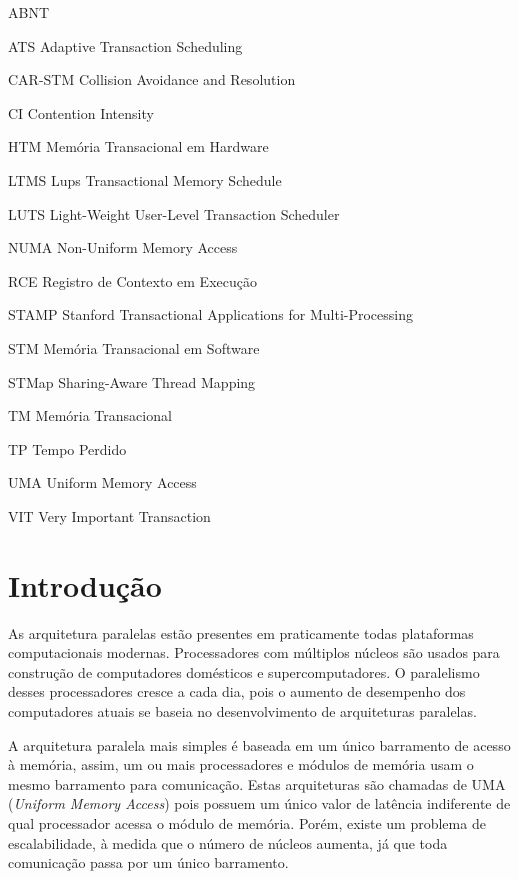 \documentclass[diss,capa]{texufpel}
\begin{document}
\begin{listofabbrv}{ABNT}%
  \item[ATS] \qquad Adaptive Transaction Scheduling
  \item[CAR-STM] \qquad Collision Avoidance and Resolution
  \item[CI] \qquad Contention Intensity
  \item[HTM] \qquad Memória Transacional em Hardware 
  \item[LTMS] \qquad Lups Transactional Memory Schedule
  \item[LUTS] \qquad Light-Weight User-Level Transaction Scheduler
  \item[NUMA] \qquad Non-Uniform Memory Access
  \item[RCE] \qquad Registro de Contexto em Execução
  \item[STAMP] \qquad Stanford Transactional Applications for Multi-Processing
  \item[STM] \qquad Memória Transacional em Software
  \item[STMap] \qquad Sharing-Aware Thread Mapping
  \item[TM] \qquad Memória Transacional
  \item[TP] \qquad Tempo Perdido
  \item[UMA] \qquad Uniform Memory Access
  \item[VIT] \qquad Very Important Transaction
\end{listofabbrv}

\tableofcontents

\chapter{Introdução}

As arquitetura paralelas estão presentes em praticamente todas plataformas computacionais modernas. Processadores com múltiplos núcleos são usados para construção de computadores domésticos e supercomputadores. O paralelismo desses processadores cresce a cada dia, pois o aumento de desempenho dos computadores atuais se baseia no desenvolvimento de arquiteturas paralelas.

A arquitetura paralela mais simples é baseada em um único barramento de acesso à memória, assim, um ou mais processadores e módulos de memória usam o mesmo barramento para comunicação. Estas arquiteturas são chamadas de UMA (\emph{Uniform Memory Access}) pois possuem um único valor de latência indiferente de qual processador acessa o módulo de memória. Porém, existe um problema de escalabilidade, à medida que o número de núcleos aumenta, já que toda comunicação passa por um único barramento.
\end{document}
